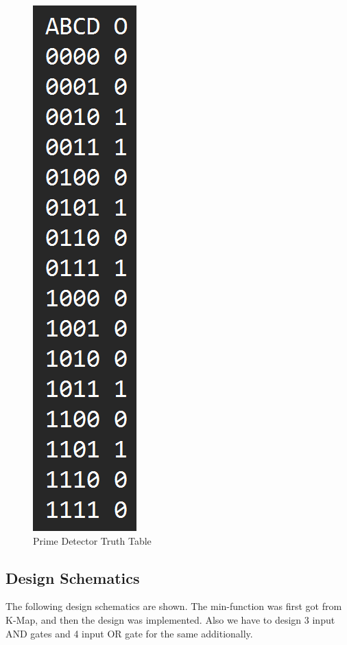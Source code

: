 \documentclass[12pt]{article}
\begin{document}
\begin{figure}[H]
\centering
  \includegraphics[scale=0.3]{Images/PrimeNumber_TT.png}
  \caption{Prime Detector Truth Table}
\end{figure}

\subsection{Design Schematics}
The following design schematics are shown. The min-function was first got from K-Map, and then the design was implemented. Also we have to design 3 input AND gates and 4 input OR gate for the same additionally. 
\end{document}
